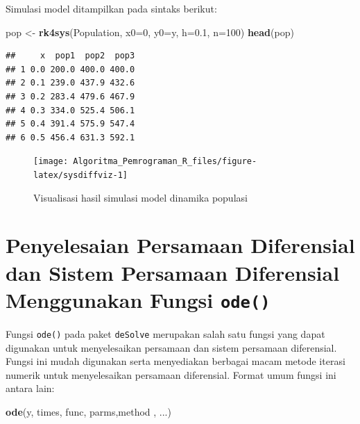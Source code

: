 \documentclass[
]{book}
\newenvironment{Shaded}{\begin{snugshade}}{\end{snugshade}}
\newcommand{\AttributeTok}[1]{\textcolor[rgb]{0.13,0.29,0.53}{#1}}
\newcommand{\DecValTok}[1]{\textcolor[rgb]{0.00,0.00,0.81}{#1}}
\newcommand{\FloatTok}[1]{\textcolor[rgb]{0.00,0.00,0.81}{#1}}
\newcommand{\FunctionTok}[1]{\textcolor[rgb]{0.13,0.29,0.53}{\textbf{#1}}}
\newcommand{\NormalTok}[1]{#1}
\newcommand{\OtherTok}[1]{\textcolor[rgb]{0.56,0.35,0.01}{#1}}
\theoremstyle{definition}
\theoremstyle{definition}
\theoremstyle{definition}
\theoremstyle{definition}
\theoremstyle{remark}
\begin{document}
Simulasi model ditampilkan pada sintaks berikut:

\begin{Shaded}
\begin{Highlighting}[]
\NormalTok{pop }\OtherTok{\textless{}{-}} \FunctionTok{rk4sys}\NormalTok{(Population, }\AttributeTok{x0=}\DecValTok{0}\NormalTok{, }\AttributeTok{y0=}\NormalTok{y, }\AttributeTok{h=}\FloatTok{0.1}\NormalTok{, }\AttributeTok{n=}\DecValTok{100}\NormalTok{)}
\FunctionTok{head}\NormalTok{(pop)}
\end{Highlighting}
\end{Shaded}

\begin{verbatim}
##     x  pop1  pop2  pop3
## 1 0.0 200.0 400.0 400.0
## 2 0.1 239.0 437.9 432.6
## 3 0.2 283.4 479.6 467.9
## 4 0.3 334.0 525.4 506.1
## 5 0.4 391.4 575.9 547.4
## 6 0.5 456.4 631.3 592.1
\end{verbatim}

\begin{figure}

{\centering \texttt{[image: Algoritma\_Pemrograman\_R\_files/figure-latex/sysdiffviz-1]} 

}

\caption{Visualisasi hasil simulasi model dinamika populasi}\label{fig:sysdiffviz}
\end{figure}

\hypertarget{penyelesaian-persamaan-diferensial-dan-sistem-persamaan-diferensial-menggunakan-fungsi-ode}{%
\section{\texorpdfstring{Penyelesaian Persamaan Diferensial dan Sistem Persamaan Diferensial Menggunakan Fungsi \texttt{ode()}}{Penyelesaian Persamaan Diferensial dan Sistem Persamaan Diferensial Menggunakan Fungsi ode()}}\label{penyelesaian-persamaan-diferensial-dan-sistem-persamaan-diferensial-menggunakan-fungsi-ode}}

Fungsi \texttt{ode()} pada paket \texttt{deSolve} merupakan salah satu fungsi yang dapat digunakan untuk menyelesaikan persamaan dan sistem persamaan diferensial. Fungsi ini mudah digunakan serta menyediakan berbagai macam metode iterasi numerik untuk menyelesaikan persamaan diferensial. Format umum fungsi ini antara lain:

\begin{Shaded}
\begin{Highlighting}[]
\FunctionTok{ode}\NormalTok{(y, times, func, parms,method , ...)}
\end{Highlighting}
\end{Shaded}
\end{document}
